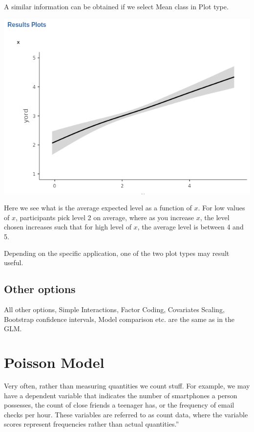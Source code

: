 \documentclass[
]{book}
\begin{document}
A similar information can be obtained if we select {Mean class} in {Plot type}.

\includegraphics{bookletpics/3_ordinal_plot2.png}

Here we see what is the average expected level as a function of \(x\). For low values of \(x\), participants pick level 2 on average, where as you increase \(x\), the level chosen increases such that for high level of \(x\), the average level is between 4 and 5.

Depending on the specific application, one of the two plot types may result useful.

\hypertarget{other-options-2}{%
\subsection{Other options}\label{other-options-2}}

All other options, {Simple Interactions}, {Factor Coding}, {Covariates Scaling}, {Bootstrap} confidence intervals, {Model comparison} etc. are the same as in the GLM.

\hypertarget{poisson-model}{%
\section{Poisson Model}\label{poisson-model}}

Very often, rather than measuring quantities we count stuff. For example, we may have a dependent variable that indicates the number of smartphones a person possesses, the count of close friends a teenager has, or the frequency of email checks per hour. These variables are referred to as count data, where the variable scores represent frequencies rather than actual quantities.''
\end{document}
